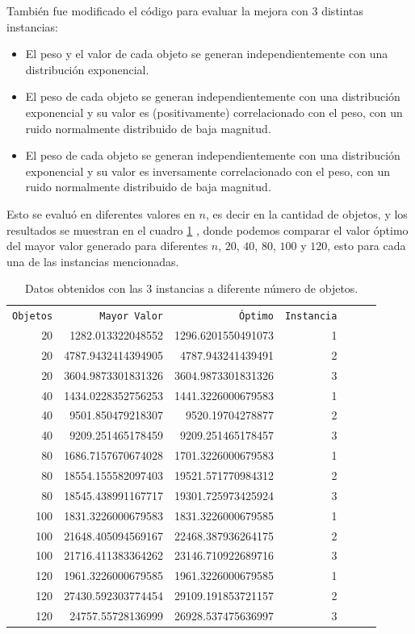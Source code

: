 \documentclass{article}
\begin{document}
Tambi\'en fue modificado el c\'odigo \citep{ana} para evaluar la mejora con $3$ distintas instancias:
\begin{itemize} \item El peso y el valor de cada objeto se generan independientemente con una distribuci\'on exponencial. \item El peso de cada objeto se generan independientemente con una distribuci\'on exponencial y su valor es (positivamente) correlacionado con el peso, con un ruido normalmente distribuido de baja magnitud. \item El peso de cada objeto se generan independientemente con una distribuci\'on exponencial y su valor es inversamente correlacionado con el peso, con un ruido normalmente distribuido de baja magnitud.
\end{itemize}

Esto se evalu\'o en diferentes valores en $n$, es decir en la cantidad de objetos, y los resultados se muestran en el cuadro \ref{t1} , donde podemos comparar el valor \'optimo del mayor valor generado para diferentes $n$, $20$, $40$, $80$, $100$ y $120$, esto para cada una de las instancias mencionadas.

\begin{table} [H]
 \caption{Datos obtenidos con las 3 instancias a diferente n\'umero de objetos.}
 \label{t1}
 \begin{center}
 \begin{tabular}{rrrrrrr}
\texttt{Objetos} & \texttt{Mayor Valor} & \texttt{\'Optimo} &\texttt{Instancia} \\
20  & 1282.013322048552   & 1296.6201550491073  & 1  \\ 
20  & 4787.9432414394905 & 4787.943241439491    & 2\\ 
20  & 3604.9873301831326 & 3604.9873301831326  & 3  \\ 
40  &1434.0228352756253  &1441.3226000679583  & 1   \\ 
40  & 9501.850479218307   &9520.19704278877 & 2 \\ 
40  & 9209.251465178459   &9209.251465178457  & 3   \\ 
80  & 1686.7157670674028 & 1701.3226000679583 & 1 \\ 
80  & 18554.155582097403 & 19521.571770984312 & 2  \\ 
80  &18545.438991167717  &19301.725973425924  & 3  \\ 
100 & 1831.3226000679583&1831.3226000679585  & 1  \\ 
100 & 21648.405094569167&22468.387936264175  & 2   \\ 
100 & 21716.411383364262& 23146.710922689716  & 3 \\ 
120 & 1961.3226000679585& 1961.3226000679585  & 1  \\ 
120 &27430.592303774454 &29109.191853721157  & 2  \\ 
120 &24757.55728136999   &26928.537475636997 & 3  \\ 

\end{tabular}
\end{center}
\end{table}
\end{document}
